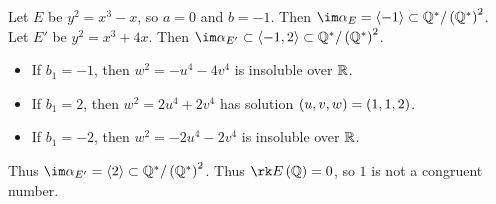 \begin{example*}
Let $ E $ be $ y^2 = x^3 - x $, so $ a = 0 $ and $ b = -1 $. Then $ \im \alpha_E = \abr{-1} \subset \QQ^* / \br{\QQ^*}^2 $. Let $ E' $ be $ y^2 = x^3 + 4x $. Then $ \im \alpha_{E'} \subset \abr{-1, 2} \subset \QQ^* / \br{\QQ^*}^2 $.
\begin{itemize}
\item If $ b_1 = -1 $, then $ w^2 = -u^4 - 4v^4 $ is insoluble over $ \mathbb{R} $.
\item If $ b_1 = 2 $, then $ w^2 = 2u^4 + 2v^4 $ has solution $ \br{u, v, w} = \br{1, 1, 2} $.
\item If $ b_1 = -2 $, then $ w^2 = -2u^4 - 2v^4 $ is insoluble over $ \mathbb{R} $.
\end{itemize}
Thus $ \im \alpha_{E'} = \abr{2} \subset \QQ^* / \br{\QQ^*}^2 $. Thus $ \rk E\br{\QQ} = 0 $, so $ 1 $ is not a congruent number.
\end{example*}


